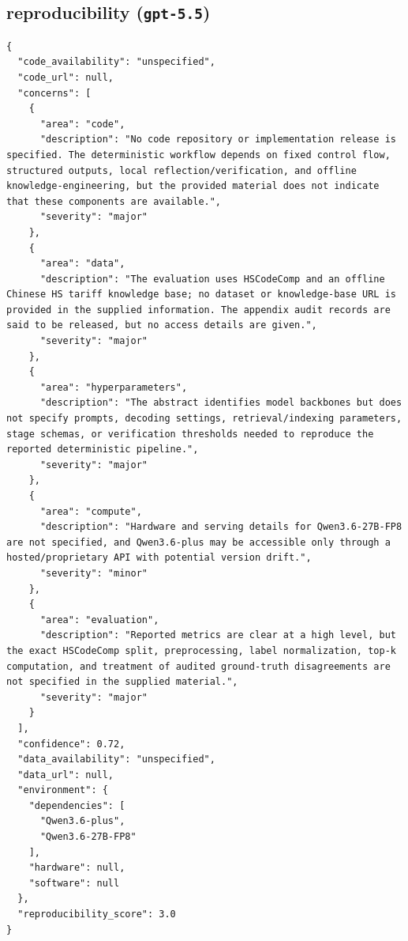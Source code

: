 \documentclass[11pt]{article}
\begin{document}
\subsection*{reproducibility (\texttt{gpt-5.5})}
\begin{verbatim}
{
  "code_availability": "unspecified",
  "code_url": null,
  "concerns": [
    {
      "area": "code",
      "description": "No code repository or implementation release is specified. The deterministic workflow depends on fixed control flow, structured outputs, local reflection/verification, and offline knowledge-engineering, but the provided material does not indicate that these components are available.",
      "severity": "major"
    },
    {
      "area": "data",
      "description": "The evaluation uses HSCodeComp and an offline Chinese HS tariff knowledge base; no dataset or knowledge-base URL is provided in the supplied information. The appendix audit records are said to be released, but no access details are given.",
      "severity": "major"
    },
    {
      "area": "hyperparameters",
      "description": "The abstract identifies model backbones but does not specify prompts, decoding settings, retrieval/indexing parameters, stage schemas, or verification thresholds needed to reproduce the reported deterministic pipeline.",
      "severity": "major"
    },
    {
      "area": "compute",
      "description": "Hardware and serving details for Qwen3.6-27B-FP8 are not specified, and Qwen3.6-plus may be accessible only through a hosted/proprietary API with potential version drift.",
      "severity": "minor"
    },
    {
      "area": "evaluation",
      "description": "Reported metrics are clear at a high level, but the exact HSCodeComp split, preprocessing, label normalization, top-k computation, and treatment of audited ground-truth disagreements are not specified in the supplied material.",
      "severity": "major"
    }
  ],
  "confidence": 0.72,
  "data_availability": "unspecified",
  "data_url": null,
  "environment": {
    "dependencies": [
      "Qwen3.6-plus",
      "Qwen3.6-27B-FP8"
    ],
    "hardware": null,
    "software": null
  },
  "reproducibility_score": 3.0
}
\end{verbatim}
\end{document}
